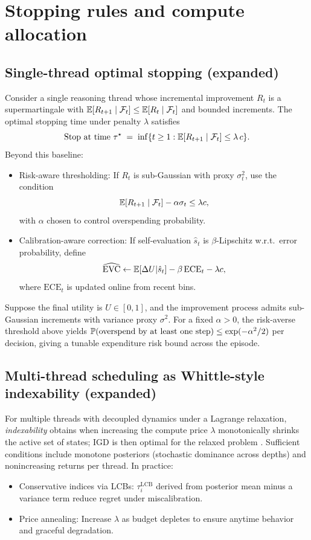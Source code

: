 \section{Stopping rules and compute allocation}

\subsection{Single-thread optimal stopping (expanded)}
Consider a single reasoning thread whose incremental improvement $R_t$ is a supermartingale with $\mathbb{E}[R_{t+1}\mid \mathcal{F}_t] \le \mathbb{E}[R_t\mid \mathcal{F}_t]$ and bounded increments. The optimal stopping time under penalty $\lambda$ satisfies
\[
\text{Stop at time } \tau^\star \;=\; \inf\{ t \ge 1 : \mathbb{E}[R_{t+1}\mid \mathcal{F}_t] \le \lambda\, c\}.
\]
Beyond this baseline:
\begin{itemize}[leftmargin=1.6em, itemsep=0.2em]
    \item Risk-aware thresholding: If $R_t$ is sub-Gaussian with proxy $\sigma_t^2$, use the condition
    \[
    \mathbb{E}[R_{t+1}\mid \mathcal{F}_t] - \alpha \sigma_t \le \lambda c,
    \]
    with $\alpha$ chosen to control overspending probability.
    \item Calibration-aware correction: If self-evaluation $\hat{s}_t$ is $\beta$-Lipschitz w.r.t.\ error probability, define
    \[
    \widehat{\mathrm{EVC}} \leftarrow \mathbb{E}[\Delta U|\hat{s}_t] - \beta \,\mathrm{ECE}_t - \lambda c,
    \]
    where $\mathrm{ECE}_t$ is updated online from recent bins.
\end{itemize}

\begin{proposition}
Suppose the final utility is $U\in[0,1]$, and the improvement process admits sub-Gaussian increments with variance proxy $\sigma^2$. For a fixed $\alpha>0$, the risk-averse threshold above yields
$\mathbb{P}(\text{overspend by at least one step}) \le \exp(-\alpha^2/2)$
per decision, giving a tunable expenditure risk bound across the episode.
\end{proposition}

\subsection{Multi-thread scheduling as Whittle-style indexability (expanded)}
For multiple threads with decoupled dynamics under a Lagrange relaxation, \emph{indexability} obtains when increasing the compute price $\lambda$ monotonically shrinks the active set of states; IGD is then optimal for the relaxed problem \cite{gittins1979,whittle1988restless}. Sufficient conditions include monotone posteriors (stochastic dominance across depths) and nonincreasing returns per thread. In practice:
\begin{itemize}[leftmargin=1.6em, itemsep=0.2em]
    \item Conservative indices via LCBs: $\tau_i^{\text{LCB}}$ derived from posterior mean minus a variance term reduce regret under miscalibration.
    \item Price annealing: Increase $\lambda$ as budget depletes to ensure anytime behavior and graceful degradation.
\end{itemize}

